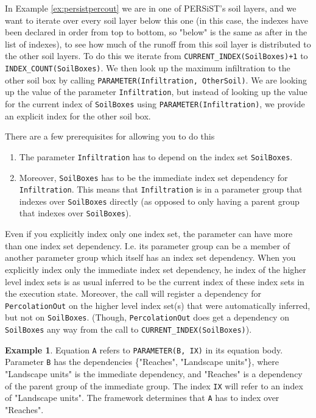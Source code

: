 \documentclass[11pt]{article}
\theoremstyle{definition}
\newtheorem{myexample}{Example}
\newenvironment{example}%
  {\begin{lrbox}{\examplebox}%
   \begin{minipage}{\dimexpr\linewidth-2\fboxsep}
   \begin{myexample}}%
  {\end{myexample}%
   \end{minipage}%
   \end{lrbox}%
   \begin{trivlist}
     \item[]\colorbox{silver}{\usebox\examplebox}
   \end{trivlist}}
\begin{document}
In Example \ref{ex:persistpercout} we are in one of PERSiST's soil layers, and we want to iterate over every soil layer below this one (in this case, the indexes have been declared in order from top to bottom, so "below" is the same as after in the list of indexes), to see how much of the runoff from this soil layer is distributed to the other soil layers. To do this we iterate from {\tt CURRENT\_INDEX(SoilBoxes)+1} to {\tt INDEX\_COUNT(SoilBoxes)}. We then look up the maximum infiltration to the other soil box by calling {\tt PARAMETER(Infiltration, OtherSoil)}. We are looking up the value of the parameter {\tt Infiltration}, but instead of looking up the value for the current index of {\tt SoilBoxes} using {\tt PARAMETER(Infiltration)}, we provide an explicit index for the other soil box.

There are a few prerequisites for allowing you to do this
\begin{enumerate}[i]
\item The parameter {\tt Infiltration} has to depend on the index set {\tt SoilBoxes}.
\item Moreover, {\tt SoilBoxes} has to be the immediate index set dependency for {\tt Infiltration}. This means that {\tt Infiltration} is in a parameter group that indexes over {\tt SoilBoxes} directly (as opposed to only having a parent group that indexes over {\tt SoilBoxes}).
\end{enumerate}
Even if you explicitly index only one index set, the parameter can have more than one index set dependency. I.e. its parameter group can be a member of another parameter group which itself has an index set dependency. When you explicitly index only the immediate index set dependency, he index of the higher level index sets is as usual inferred to be the current index of these index sets in the execution state. Moreover, the call will register a dependency for {\tt PercolationOut} on the higher level index set(s) that were automatically inferred, but not on {\tt SoilBoxes}. (Though, {\tt PercolationOut} does get a dependency on  {\tt SoilBoxes} any way from the call to {\tt CURRENT\_INDEX(SoilBoxes)}).

\begin{example}
Equation {\tt A} refers to {\tt PARAMETER(B, IX)} in its equation body. Parameter {\tt B} has the dependencies \{"Reaches", "Landscape units"\}, where "Landscape units" is the immediate dependency, and "Reaches" is a dependency of the parent group of the immediate group. The index {\tt IX} will refer to an index of "Landscape units". The framework determines that {\tt A} has to index over "Reaches".
\end{example}
\end{document}
